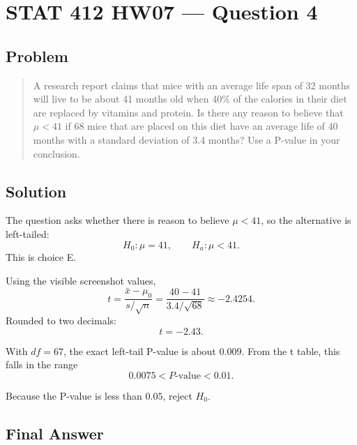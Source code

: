 \documentclass[11pt]{article}
\begin{document}
\section*{STAT 412 HW07 --- Question 4}

\subsection*{Problem}

\begin{quote}
A research report claims that mice with an average life span of 32 months will live to be about 41 months old when 40\% of the calories in their diet are replaced by vitamins and protein. Is there any reason to believe that $\mu<41$ if 68 mice that are placed on this diet have an average life of 40 months with a standard deviation of 3.4 months? Use a P-value in your conclusion.
\end{quote}

\subsection*{Solution}

The question asks whether there is reason to believe $\mu<41$, so the alternative is left-tailed:
\[
H_0:\mu=41,\qquad H_a:\mu<41.
\]
This is choice E.

Using the visible screenshot values,
\[
t=\frac{\bar{x}-\mu_0}{s/\sqrt{n}}
  =\frac{40-41}{3.4/\sqrt{68}}
  \approx -2.4254.
\]
Rounded to two decimals:
\[
t=-2.43.
\]

With $df=67$, the exact left-tail P-value is about $0.009$. From the t table, this falls in the range
\[
0.0075<P\text{-value}<0.01.
\]

Because the P-value is less than $0.05$, reject $H_0$.

\subsection*{Final Answer}

\end{document}
